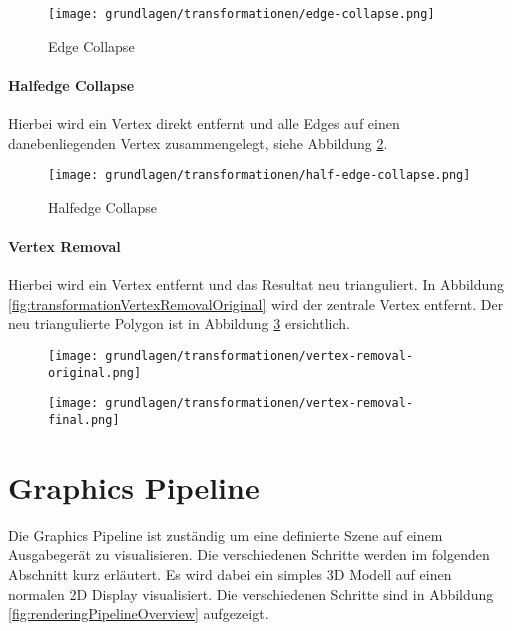 \begin{figure}[H]
  \centering
  \texttt{[image: grundlagen/transformationen/edge-collapse.png]}
  \caption{Edge Collapse}
  \label{fig:transformationEdgeCollapse}
\end{figure}

\paragraph{Halfedge Collapse}
Hierbei wird ein Vertex direkt entfernt und alle Edges auf einen danebenliegenden Vertex zusammengelegt, siehe Abbildung \ref{fig:transformationHalfedgeCollapse}.

\begin{figure}[H]
  \centering
  \texttt{[image: grundlagen/transformationen/half-edge-collapse.png]}
  \caption{Halfedge Collapse}
  \label{fig:transformationHalfedgeCollapse}
\end{figure}

\paragraph{Vertex Removal}
Hierbei wird ein Vertex entfernt und das Resultat neu trianguliert.
In Abbildung \ref{fig:transformationVertexRemovalOriginal} wird der zentrale Vertex entfernt. Der neu triangulierte Polygon ist in Abbildung \ref{fig:transformationVertexRemovalFinal} ersichtlich.

\begin{figure}[H]
  \centering
  \begin{minipage}{.5\textwidth}
    \centering
    \texttt{[image: grundlagen/transformationen/vertex-removal-original.png]}
    \label{fig:transformationVertexRemovalOriginal}
  \end{minipage}
  \begin{minipage}{.5\textwidth}
    \centering
    \texttt{[image: grundlagen/transformationen/vertex-removal-final.png]}
    \label{fig:transformationVertexRemovalFinal}
  \end{minipage}
\end{figure}

\section{Graphics Pipeline}
Die Graphics Pipeline ist zuständig um eine definierte Szene auf einem Ausgabegerät zu visualisieren. Die verschiedenen Schritte werden im folgenden Abschnitt kurz erläutert. Es wird dabei ein simples 3D Modell auf einen normalen 2D Display visualisiert. Die verschiedenen Schritte sind in Abbildung \ref{fig:renderingPipelineOverview} aufgezeigt.

